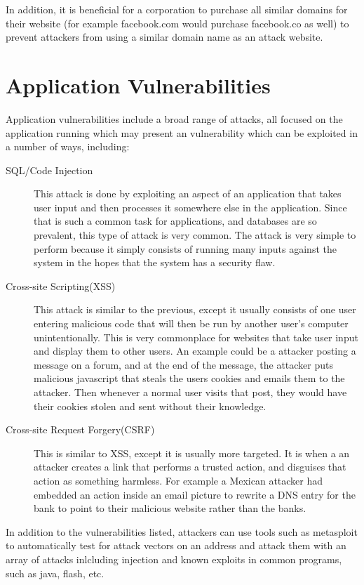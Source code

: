 \documentclass{article}
\numberwithin{equation}{section} %
\numberwithin{figure}{section} %
\numberwithin{table}{section} %
\begin{document}
In addition, it is beneficial for a corporation to purchase all similar domains for their website (for example facebook.com would purchase facebook.co as well) to prevent attackers from using a similar domain name as an attack website.

\section{Application Vulnerabilities}
Application vulnerabilities include a broad range of attacks, all focused on the application running which may present an vulnerability which can be exploited in a number of ways, including:

\begin{description}
	\item[SQL/Code Injection]  This attack is done by exploiting an aspect of an application that takes user input and then processes it somewhere else in the application.  Since that is such a common task for applications, and databases are so prevalent, this type of attack is very common.  The attack is very simple to perform because it simply consists of running many inputs against the system in the hopes that the system has a security flaw.
	\item[Cross-site Scripting(XSS)] This attack is similar to the previous, except it usually consists of one user entering malicious code that will then be run by another user's computer unintentionally.  This is very commonplace for websites that take user input and display them to other users.  An example could be a attacker posting a message on a forum, and at the end of the message, the attacker puts malicious javascript that steals the users cookies and emails them to the attacker.  Then whenever a normal user visits that post, they would have their cookies stolen and sent without their knowledge.
	\item[Cross-site Request Forgery(CSRF)] This is similar to XSS, except it is usually more targeted.  It is when a an attacker creates a link that performs a trusted action, and disguises that action as something harmless.  For example a Mexican attacker had embedded an action inside an email picture to rewrite a DNS entry for the bank to point to their malicious website rather than the banks.\cite{csrf}  
\end{description}

In addition to the vulnerabilities listed, attackers can use tools such as metasploit to automatically test for attack vectors on an address and attack them with an array of attacks inlcluding injection and known exploits in common programs, such as java, flash, etc.
\end{document}
